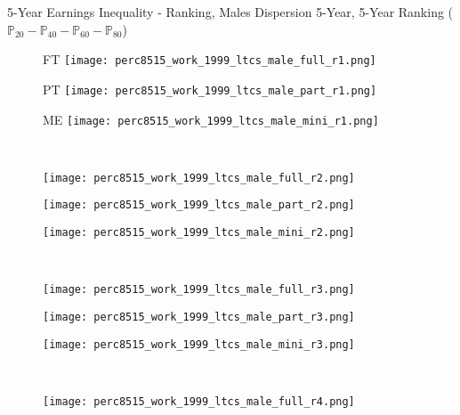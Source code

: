 \documentclass[hyperref={bookmarks=false}]{beamer}
\begin{document}
\begin{appendix}
\begin{frame}{5-Year Earnings Inequality - Ranking, Males}
Dispersion 5-Year, 5-Year Ranking ($\mathbb{P}_{20}-\mathbb{P}_{40}-\mathbb{P}_{60}-\mathbb{P}_{80}$)
\begin{figure}[!t]
\begin{minipage}[b]{0.15\textwidth}{FT}
\centering
\texttt{[image: perc8515\_work\_1999\_ltcs\_male\_full\_r1.png]}
\end{minipage}
\begin{minipage}[b]{0.15\textwidth}{PT}
\centering
\texttt{[image: perc8515\_work\_1999\_ltcs\_male\_part\_r1.png]}
\end{minipage}
\begin{minipage}[b]{0.15\textwidth}{ME}
\centering
\texttt{[image: perc8515\_work\_1999\_ltcs\_male\_mini\_r1.png]}
\end{minipage}\\
\begin{minipage}[b]{0.15\textwidth}{}
\centering
\texttt{[image: perc8515\_work\_1999\_ltcs\_male\_full\_r2.png]}
\end{minipage}
\begin{minipage}[b]{0.15\textwidth}{}
\centering
\texttt{[image: perc8515\_work\_1999\_ltcs\_male\_part\_r2.png]}
\end{minipage}
\begin{minipage}[b]{0.15\textwidth}{}
\centering
\texttt{[image: perc8515\_work\_1999\_ltcs\_male\_mini\_r2.png]}
\end{minipage}\\
\begin{minipage}[b]{0.15\textwidth}{}
\centering
\texttt{[image: perc8515\_work\_1999\_ltcs\_male\_full\_r3.png]}
\end{minipage}
\begin{minipage}[b]{0.15\textwidth}{}
\centering
\texttt{[image: perc8515\_work\_1999\_ltcs\_male\_part\_r3.png]}
\end{minipage}
\begin{minipage}[b]{0.15\textwidth}{}
\centering
\texttt{[image: perc8515\_work\_1999\_ltcs\_male\_mini\_r3.png]}
\end{minipage}\\
\begin{minipage}[b]{0.15\textwidth}{}
\centering
\texttt{[image: perc8515\_work\_1999\_ltcs\_male\_full\_r4.png]}
\end{minipage}

\end{figure}
\end{frame}
\end{appendix}
\end{document}
